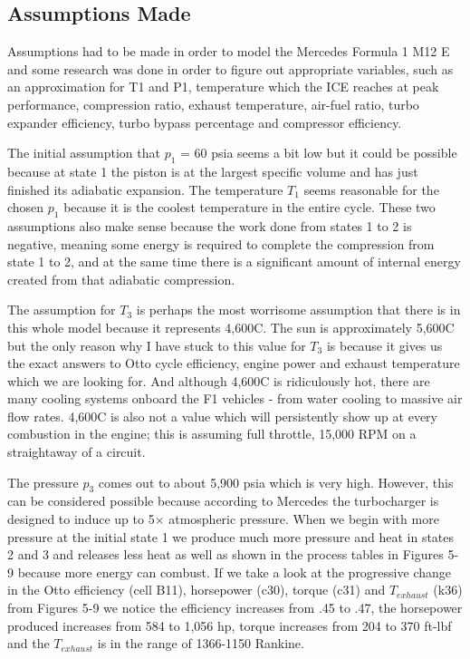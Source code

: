 \documentclass{article}
\begin{document}
\subsection{Assumptions Made}
Assumptions had to be made in order to model the Mercedes Formula 1 M12 E and some research was done in order to figure out appropriate variables, such as an approximation for T1 and P1, temperature which the ICE reaches at peak performance, compression ratio, exhaust temperature, air-fuel ratio, turbo expander efficiency, turbo bypass percentage and compressor efficiency. \par
The initial assumption that $p_1$ = 60 psia seems a bit low but it could be possible because at state 1 the piston is at the largest specific volume and has just finished its adiabatic expansion. The temperature $T_1$ seems reasonable for the chosen $p_1$ because it is the coolest temperature in the entire cycle. These two assumptions also make sense because the work done from states 1 to 2 is negative, meaning some energy is required to complete the compression from state 1 to 2, and at the same time there is a significant amount of internal energy created from that adiabatic compression. \par
The assumption for $T_3$ is perhaps the most worrisome assumption that there is in this whole model because it represents 4,600C. The sun is approximately 5,600C but the only reason why I have stuck to this value for $T_3$ is because it gives us the exact answers to Otto cycle efficiency, engine power and exhaust temperature which we are looking for. And although 4,600C is ridiculously hot, there are many cooling systems onboard the F1 vehicles - from water cooling to massive air flow rates. 4,600C is also not a value which will persistently show up at every combustion in the engine; this is assuming full throttle, 15,000 RPM on a straightaway of a circuit. \par
The pressure $p_3$ comes out to about 5,900 psia which is very high. However, this can be considered possible because according to Mercedes the turbocharger is designed to induce up to 5$\times$ atmospheric pressure\cite{F1engineFacts}. When we begin with more pressure at the initial state 1 we produce much more pressure and heat in states 2 and 3 and releases less heat as well as shown in the process tables in Figures 5-9 because more energy can combust. If we take a look at the progressive change in the Otto efficiency (cell B11), horsepower (c30), torque (c31) and $T_{exhaust} $ (k36) from Figures 5-9 we notice the efficiency increases from .45 to .47, the horsepower produced increases from 584 to 1,056 hp, torque increases from 204 to 370 ft-lbf and the $T_{exhaust}$ is in the range of 1366-1150 Rankine.
\end{document}
